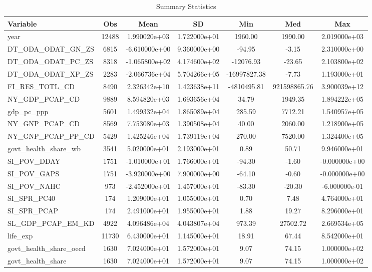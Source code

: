 \begin{table}
\centering
\caption{Summary Statistics}
\label{Sum_Stats}
\begin{tabular}{lcccccc}
\toprule
              Variable &   Obs &          Mean &           SD &          Min &          Med &           Max \\
\midrule
year & 12488 & 1.990020e+03 & 1.722000e+01 & 1960.00 & 1990.00 & 2.019000e+03 \\
DT\_ODA\_ODAT\_GN\_ZS & 6815 & -6.610000e+00 & 9.360000e+00 & -94.95 & -3.15 & 2.310000e+00 \\
DT\_ODA\_ODAT\_PC\_ZS & 8318 & -1.065800e+02 & 4.174600e+02 & -12076.93 & -23.65 & 2.103800e+02 \\
DT\_ODA\_ODAT\_XP\_ZS & 2283 & -2.066736e+04 & 5.704266e+05 & -16997827.38 & -7.73 & 1.193000e+01 \\
FI\_RES\_TOTL\_CD & 8490 & 2.326342e+10 & 1.423638e+11 & -4810495.81 & 921598865.76 & 3.900039e+12 \\
NY\_GDP\_PCAP\_CD & 9889 & 8.594820e+03 & 1.693656e+04 & 34.79 & 1949.35 & 1.894222e+05 \\
gdp\_pc\_ppp & 5601 & 1.499332e+04 & 1.865089e+04 & 285.59 & 7712.21 & 1.540957e+05 \\
NY\_GNP\_PCAP\_CD & 8569 & 7.753080e+03 & 1.390508e+04 & 40.00 & 2060.00 & 1.218900e+05 \\
NY\_GNP\_PCAP\_PP\_CD & 5429 & 1.425246e+04 & 1.739119e+04 & 270.00 & 7520.00 & 1.324400e+05 \\
govt\_health\_share\_wb & 3541 & 5.020000e+01 & 2.193000e+01 & 0.89 & 50.71 & 9.946000e+01 \\
SI\_POV\_DDAY & 1751 & -1.010000e+01 & 1.766000e+01 & -94.30 & -1.60 & -0.000000e+00 \\
SI\_POV\_GAPS & 1751 & -3.920000e+00 & 7.900000e+00 & -64.10 & -0.60 & -0.000000e+00 \\
SI\_POV\_NAHC & 973 & -2.452000e+01 & 1.457000e+01 & -83.30 & -20.30 & -6.000000e-01 \\
SI\_SPR\_PC40 & 174 & 1.209000e+01 & 1.055000e+01 & 0.70 & 7.48 & 4.764000e+01 \\
SI\_SPR\_PCAP & 174 & 2.491000e+01 & 1.955000e+01 & 1.88 & 19.27 & 8.296000e+01 \\
SL\_GDP\_PCAP\_EM\_KD & 4922 & 4.096486e+04 & 4.043807e+04 & 973.39 & 27502.72 & 2.669534e+05 \\
life\_exp & 11730 & 6.430000e+01 & 1.145000e+01 & 18.91 & 67.44 & 8.542000e+01 \\
govt\_health\_share\_oecd & 1630 & 7.024000e+01 & 1.572000e+01 & 9.07 & 74.15 & 1.000000e+02 \\
govt\_health\_share & 1630 & 7.024000e+01 & 1.572000e+01 & 9.07 & 74.15 & 1.000000e+02 \\
\bottomrule
\end{tabular}
\end{table}
